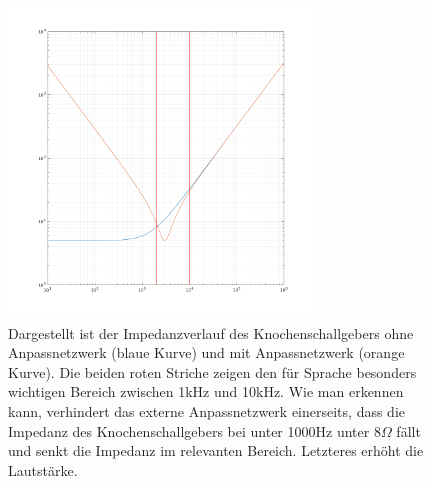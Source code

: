   \begin{figure}[h]
	\centering
	\includegraphics[width=0.72\textwidth]{graphics/RLGlied.png}
	\caption{Dargestellt ist der Impedanzverlauf des Knochenschallgebers ohne Anpassnetzwerk (blaue Kurve) und mit Anpassnetzwerk (orange Kurve). Die beiden roten Striche zeigen den für Sprache besonders wichtigen Bereich zwischen 1kHz und 10kHz.
	Wie man erkennen kann, verhindert das externe Anpassnetzwerk einerseits, dass die Impedanz des Knochenschallgebers bei unter 1000Hz unter 8\(\Omega\) fällt und senkt die Impedanz im relevanten Bereich. Letzteres erhöht die Lautstärke.}
	\label{fig:Impedanz_Knochenschall_modell}
  \end{figure}
  
  